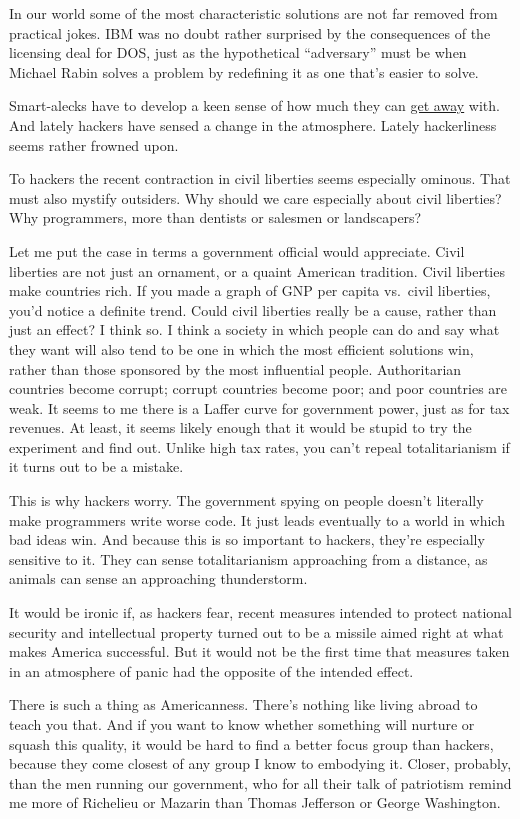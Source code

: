In our world some of the most characteristic solutions are not far
removed from practical jokes. IBM was no doubt rather surprised by the
consequences of the licensing deal for DOS, just as the hypothetical
``adversary'' must be when Michael Rabin solves a problem by redefining
it as one that's easier to solve.

Smart-alecks have to develop a keen sense of how much they can
\href{say.html}{get away} with. And lately hackers have sensed a change
in the atmosphere. Lately hackerliness seems rather frowned upon.

To hackers the recent contraction in civil liberties seems especially
ominous. That must also mystify outsiders. Why should we care especially
about civil liberties? Why programmers, more than dentists or salesmen
or landscapers?

Let me put the case in terms a government official would appreciate.
Civil liberties are not just an ornament, or a quaint American
tradition. Civil liberties make countries rich. If you made a graph of
GNP per capita vs.~civil liberties, you'd notice a definite trend. Could
civil liberties really be a cause, rather than just an effect? I think
so. I think a society in which people can do and say what they want will
also tend to be one in which the most efficient solutions win, rather
than those sponsored by the most influential people. Authoritarian
countries become corrupt; corrupt countries become poor; and poor
countries are weak. It seems to me there is a Laffer curve for
government power, just as for tax revenues. At least, it seems likely
enough that it would be stupid to try the experiment and find out.
Unlike high tax rates, you can't repeal totalitarianism if it turns out
to be a mistake.

This is why hackers worry. The government spying on people doesn't
literally make programmers write worse code. It just leads eventually to
a world in which bad ideas win. And because this is so important to
hackers, they're especially sensitive to it. They can sense
totalitarianism approaching from a distance, as animals can sense an
approaching thunderstorm.

It would be ironic if, as hackers fear, recent measures intended to
protect national security and intellectual property turned out to be a
missile aimed right at what makes America successful. But it would not
be the first time that measures taken in an atmosphere of panic had the
opposite of the intended effect.

There is such a thing as Americanness. There's nothing like living
abroad to teach you that. And if you want to know whether something will
nurture or squash this quality, it would be hard to find a better focus
group than hackers, because they come closest of any group I know to
embodying it. Closer, probably, than the men running our government, who
for all their talk of patriotism remind me more of Richelieu or Mazarin
than Thomas Jefferson or George Washington.

